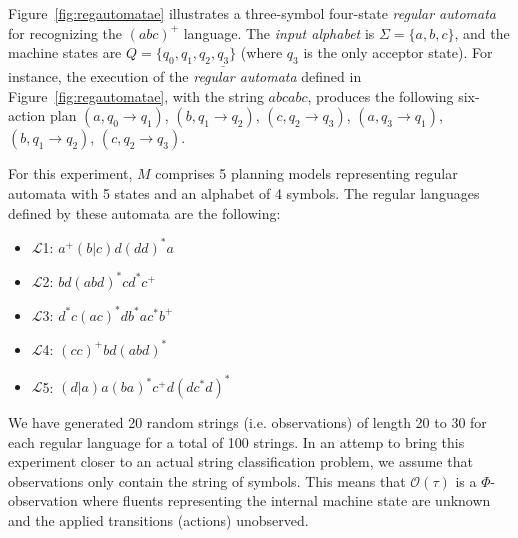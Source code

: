\documentclass[letterpaper]{article} %
\newcommand{\tup}[1]{{\langle #1 \rangle}}
\begin{document}
Figure~\ref{fig:regautomatae} illustrates a three-symbol four-state {\em regular automata} for recognizing the $(abc)^+$ language. The {\em input alphabet} is $\Sigma=\{a,b,c\}$, and the machine states are $Q=\{q_0,q_1,q_2,\underline{q_3}\}$ (where \underline{$q_3$} is the only acceptor state). For instance, the execution of the {\em regular automata} defined in Figure~\ref{fig:regautomatae}, with the string $abcabc$, produces the following six-action plan {\small $(a,q_0\rightarrow q_1)$, $(b,q_1\rightarrow q_2)$, $(c,q_2\rightarrow q_3)$, $(a,q_3\rightarrow q_1)$, $(b,q_1\rightarrow q_2)$, $(c,q_2\rightarrow q_3)$}.

For this experiment, $M$ comprises 5 planning models representing regular automata with 5 states and an alphabet of 4 symbols. The regular languages defined by these automata are the following:
\begin{itemize}
	\item $\mathcal{L}$1: $a^+(b|c)d(dd)^*a$
	\item $\mathcal{L}$2: $bd(abd)^*cd^*c^+$
	\item $\mathcal{L}$3: $d^*c(ac)^*db^*ac^*b^+$
	\item $\mathcal{L}$4: $(cc)^+bd(abd)^*$
	\item $\mathcal{L}$5: $(d|a)a(ba)^*c^+d(dc^*d)^*$
\end{itemize}

We have generated 20 random strings (i.e. observations) of length 20 to 30 for each regular language for a total of 100 strings. In an attemp to bring this experiment closer to an actual string classification problem, we assume that observations only contain the string of symbols. This means that $\mathcal{O}(\tau)$ is a $\Phi$-observation where fluents representing the internal machine state are unknown and the applied transitions (actions) unobserved.

\end{document}
